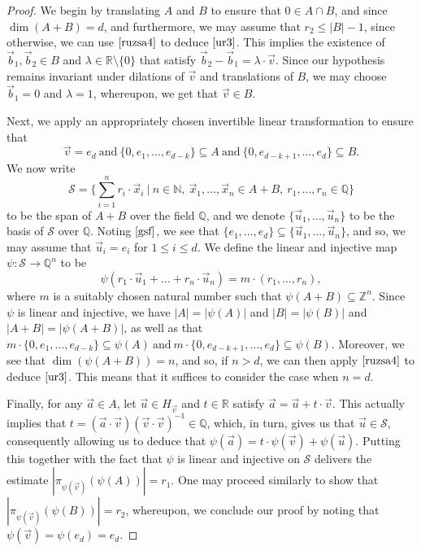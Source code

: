 \begin{proof}
 We begin by translating $A$ and $B$ to ensure that $0 \in A \cap B$, and since $\dim(A+B) = d$, and furthermore, we may assume that $r_2 \leq |B| -1$, since otherwise, we can use $\eqref{ruzsa4}$ to deduce $\eqref{ur3}$. This implies the existence of $\vec{b}_1, \vec{b}_2 \in B$ and $\lambda \in \mathbb{R} \setminus \{0\}$ that satisfy $\vec{b}_2 - \vec{b}_1 = \lambda  \cdot \vec{v}$. Since our hypothesis remains invariant under dilations of $\vec{v}$ and translations of $B$, we may choose $\vec{b}_1 = 0$ and $\lambda = 1$, whereupon, we get that $\vec{v} \in B$.
\par

Next, we apply an appropriately chosen invertible linear transformation to ensure that
\begin{equation} \label{gsf}
 \vec{v} = e_d \ \text{and} \ \{0, e_1, \dots, e_{d-k}\} \subseteq A \ \text{and} \ \{0, e_{d-k+1}, \dots, e_{d} \} \subseteq B. 
 \end{equation}
We now write
\[ \mathcal{S} = \big\{ \sum_{i=1}^{n} r_i \cdot \vec{x}_i \ | \ n \in \mathbb{N}, \ \vec{x}_1, \dots, \vec{x}_n \in A+B , \ r_1, \dots, r_n \in \mathbb{Q}\big\}\]
to be the span of $A+B$ over the field $\mathbb{Q}$, and we denote $\{\vec{u}_1, \dots, \vec{u}_n\}$ to be the basis of $\mathcal{S}$ over $\mathbb{Q}$. Noting $\eqref{gsf}$, we see that $\{e_1, \dots, e_d\} \subseteq \{\vec{u}_1, \dots, \vec{u}_n\}$, and so, we may assume that $\vec{u}_i = e_i$ for $1 \leq i \leq d$. We define the linear and injective map $\psi : \mathcal{S} \to \mathbb{Q}^n$ to be 
\[ \psi(r_1 \cdot \vec{u}_1 + \dots + r_n \cdot \vec{u}_n) = m \cdot (r_1, \dots, r_n), \]
where $m$ is a suitably chosen natural number such that $\psi(A+B) \subseteq \mathbb{Z}^n$. Since $\psi$ is linear and injective, we have $|A| = |\psi(A)|$ and $|B| = |\psi(B)|$ and $|A+B| = |\psi(A+B)|$, as well as that $m \cdot \{0, e_1, \dots, e_{d-k} \} \subseteq \psi(A) \ \text{and} \ m \cdot \{0, e_{d-k+1}, \dots, e_{d} \} \subseteq \psi(B).$ Moreover, we see that $\dim(\psi(A+B)) = n$, and so, if $n> d$, we can then apply $\eqref{ruzsa4}$ to deduce $\eqref{ur3}$. This means that it suffices to consider the case when $n = d$.
\par

Finally, for any $\vec{a} \in A$, let $\vec{u} \in H_{\vec{v}}$ and $t \in \mathbb{R}$ satisfy $\vec{a} = \vec{u} + t \cdot \vec{v}$. This actually implies that $t = (\vec{a} \cdot \vec{v} )(\vec{v} \cdot \vec{v})^{-1} \in \mathbb{Q}$, which, in turn, gives us that $\vec{u} \in \mathcal{S}$, consequently allowing us to deduce that $\psi(\vec{a}) = t \cdot \psi(\vec{v}) + \psi(\vec{u})$. Putting this together with the fact that $\psi$ is linear and injective on $\mathcal{S}$ delivers the estimate $|\pi_{\psi(\vec{v})}(\psi(A))| = r_1$. One may proceed similarly to show that $|\pi_{\psi(\vec{v})}(\psi(B))| = r_2$, whereupon, we conclude our proof by noting that $\psi(\vec{v}) = \psi(e_d) = e_d$.
\end{proof}

